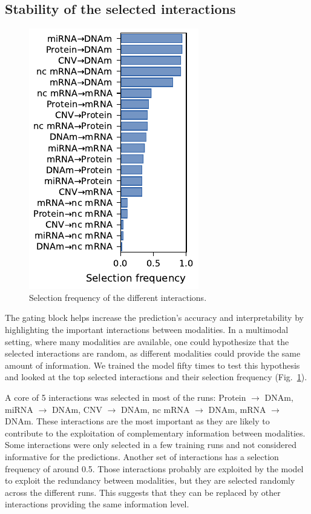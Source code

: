 \documentclass[../main.tex]{subfiles}
\begin{document}
 \subsection{Stability of the selected interactions}
     \begin{figure}
         \centering
         \vspace{-\intextsep}
         \includegraphics[scale=1]{selection_stability.pdf}
         \caption{Selection frequency of the different interactions.}
         \label{fig:alphas_stability}
     \end{figure}
     The gating block helps increase the prediction's accuracy and interpretability by highlighting the important interactions between modalities.
     In a multimodal setting, where many modalities are available, one could hypothesize that the selected interactions are random, as different modalities could provide the same amount of information.
     We trained the model fifty times to test this hypothesis and looked at the top selected interactions and their selection frequency (Fig.~\ref{fig:alphas_stability}).

     A core of 5 interactions was selected in most of the runs: Protein $\rightarrow$ DNAm, miRNA $\rightarrow$ DNAm, CNV $\rightarrow$ DNAm, nc mRNA $\rightarrow$ DNAm, mRNA $\rightarrow$ DNAm.
     These interactions are the most important as they are likely to contribute to the exploitation of complementary information between modalities.
     Some interactions were only selected in a few training runs and not considered informative for the predictions.
     Another set of interactions has a selection frequency of around 0.5.
     Those interactions probably are exploited by the model to exploit the redundancy between modalities, but they are selected randomly across the different runs.
     This suggests that they can be replaced by other interactions providing the same information level.
\end{document}
